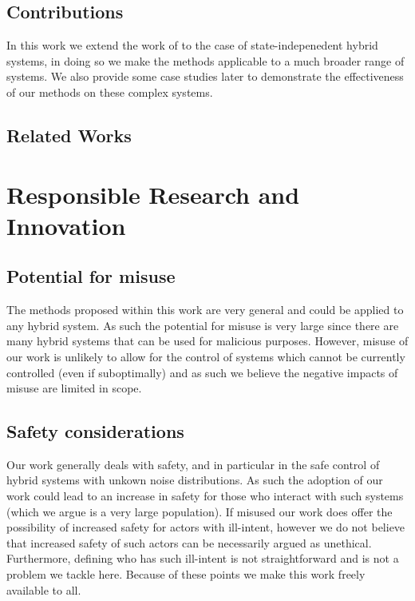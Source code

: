 \documentclass[twoside,twocolumn]{article}
\begin{document}
\subsection{Contributions}

In this work we extend the work of \cite{} to the case of state-indepenedent hybrid systems, in doing so we make the methods applicable to a much broader range of systems. We also provide some case studies later to demonstrate the effectiveness of our methods on these complex systems.

\subsection{Related Works}

\section{Responsible Research and Innovation}

\subsection{Potential for misuse}

The methods proposed within this work are very general and could be applied to any hybrid system. As such the potential for misuse is very large since there are many hybrid systems that can be used for malicious purposes. However, misuse of our work is unlikely to allow for the control of systems which cannot be currently controlled (even if suboptimally) and as such we believe the negative impacts of misuse are limited in scope.

\subsection{Safety considerations}

Our work generally deals with safety, and in particular in the safe control of hybrid systems with unkown noise distributions. As such the adoption of our work could lead to an increase in safety for those who interact with such systems (which we argue is a very large population). If misused our work does offer the possibility of increased safety for actors with ill-intent, however we do not believe that increased safety of such actors can be necessarily argued as unethical. Furthermore, defining who has such ill-intent is not straightforward and is not a problem we tackle here. Because of these points we make this work freely available to all.
\end{document}
